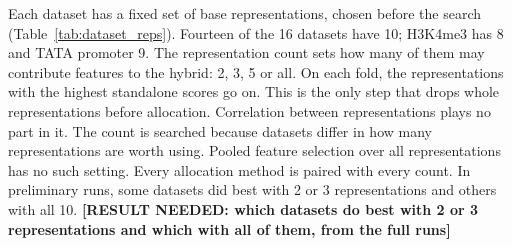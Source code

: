 Each dataset has a fixed set of base representations, chosen before the search (Table~\ref{tab:dataset_reps}). Fourteen of the 16 datasets have 10; H3K4me3 has 8 and TATA promoter 9. The representation count sets how many of them may contribute features to the hybrid: 2, 3, 5 or all. On each fold, the representations with the highest standalone scores go on. This is the only step that drops whole representations before allocation. Correlation between representations plays no part in it. The count is searched because datasets differ in how many representations are worth using. Pooled feature selection over all representations has no such setting. Every allocation method is paired with every count. In preliminary runs, some datasets did best with 2 or 3 representations and others with all 10. \textbf{[RESULT NEEDED: which datasets do best with 2 or 3 representations and which with all of them, from the full runs]}

